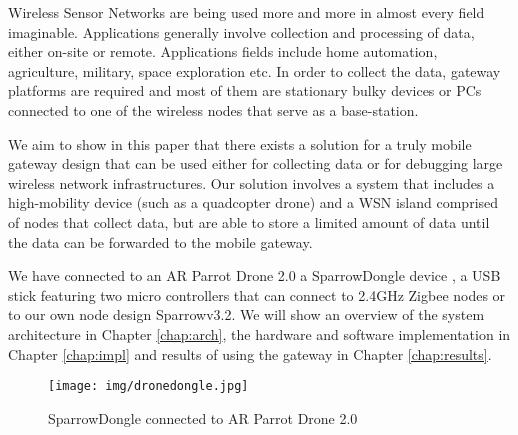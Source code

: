 Wireless Sensor Networks are being used more and more in almost every field imaginable. Applications generally involve collection and processing of data, either on-site or remote. Applications fields include home automation, agriculture, military, space exploration etc.\cite{baggio2005wireless} In order to collect the data, gateway platforms \cite{steenkamp2009wireless} are required and most of them are stationary bulky devices or PCs connected to one of the wireless nodes that serve as a base-station. 

We aim to show in this paper that there exists a solution for a truly mobile gateway design that can be used either for collecting data or for debugging large wireless network infrastructures. Our solution involves a system that includes a high-mobility device (such as a quadcopter drone) and a WSN island comprised of nodes that collect data, but are able to store a limited amount of data until the data can be forwarded to the mobile gateway.\cite{valente2011air}

We have connected to an AR Parrot Drone 2.0 a SparrowDongle device \cite{voinescu2013lightweight}, a USB stick featuring two micro controllers that can connect to 2.4GHz Zigbee nodes or to our own node design Sparrowv3.2. We will show an overview of the system architecture in Chapter \ref{chap:arch}, the hardware and software implementation in Chapter \ref{chap:impl} and results of using the gateway in Chapter \ref{chap:results}. 



\begin{figure}[ht] \centering
\texttt{[image: img/dronedongle.jpg]} \caption{SparrowDongle connected to AR Parrot Drone 2.0 } \end{figure}


